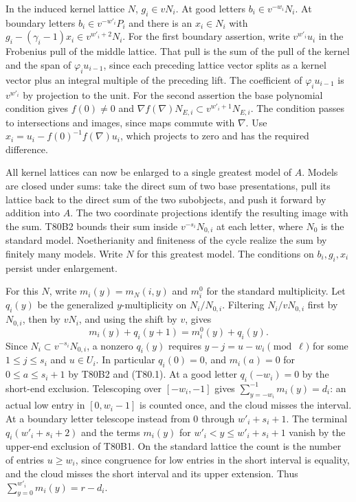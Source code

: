 In the induced kernel lattice $N$, $g_i\in vN_i$. At good letters
$b_i\in v^{-w_i}N_i$. At boundary letters $b_i\in v^{-w'_i}P_i$
and there is an $x_i\in N_i$ with $g_i-(\gamma_i-1)x_i\in
v^{w'_i+2}N_i$. For the first boundary assertion, write
$v^{w'_i}u_i$ in the Frobenius pull of the middle lattice. That pull
is the sum of the pull of the kernel and the span of
$\varphi_i u_{i-1}$, since each preceding lattice vector splits as a
kernel vector plus an integral multiple of the preceding lift.
The coefficient of $\varphi_i u_{i-1}$ is $v^{w'_i}$ by projection
to the unit. For the second assertion the base polynomial condition
gives $f(0)\ne0$ and
$\nabla f(\nabla)N_{E,i}\subset v^{w'_i+1}N_{E,i}$.
The condition passes to intersections and images, since maps commute
with $\nabla$. Use $x_i=u_i-f(0)^{-1}f(\nabla)u_i$, which projects
to zero and has the required difference.

All kernel lattices can now be enlarged to a single greatest model of
$A$. Models are closed under sums: take the direct sum of two base
presentations, pull its lattice back to the direct sum of the two
subobjects, and push it forward by addition into $A$. The two
coordinate projections identify the resulting image with the sum. T80B2 bounds their sum inside $v^{-s_i}N_{0,i}$
at each letter, where $N_0$ is the standard model. Noetherianity and
finiteness of the cycle realize the sum by finitely many models. Write
$N$ for this greatest model. The conditions on $b_i,g_i,x_i$ persist
under enlargement.

For this $N$, write $m_i(y)=m_N(i,y)$ and $m^0_i$ for the standard
multiplicity. Let $q_i(y)$ be the generalized $y$-multiplicity on
$N_i/N_{0,i}$. Filtering $N_i/vN_{0,i}$ first by $N_{0,i}$, then
by $vN_i$, and using the shift by $v$, gives
\[
 m_i(y)+q_i(y+1)=m^0_i(y)+q_i(y).
\]
Since $N_i\subset v^{-s_i}N_{0,i}$, a nonzero $q_i(y)$ requires
$y-j=u-w_i\pmod\ell$ for some $1\le j\le s_i$ and $u\in U_i$.
In particular $q_i(0)=0$, and $m_i(a)=0$ for $0\le a\le s_i+1$
by T80B2 and (T80.1). At a good letter $q_i(-w_i)=0$ by the
short-end exclusion. Telescoping over $[-w_i,-1]$ gives
$\sum_{y=-w_i}^{-1}m_i(y)=d_i$: an actual low entry in
$[0,w_i-1]$ is counted once, and the cloud misses the interval.
At a boundary letter telescope instead from $0$ through $w'_i+s_i+1$.
The terminal $q_i(w'_i+s_i+2)$ and the terms $m_i(y)$ for
$w'_i<y\le w'_i+s_i+1$ vanish by the upper-end exclusion of T80B1.
On the standard lattice the count is the number of entries $u\ge w_i$,
since congruence for low entries in the short interval is equality,
and the cloud misses the short interval and its upper extension. Thus
$\sum_{y=0}^{w'_i}m_i(y)=r-d_i$.

